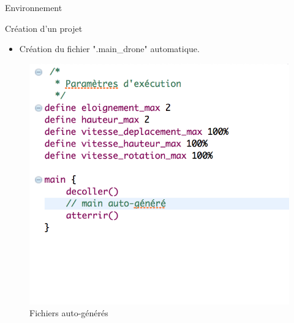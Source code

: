 \documentclass{bredelebeamer}
\begin{document}
\begin{frame}{Environnement}
\begin{block}{Création d'un projet}
\begin{itemize}
\item Création du fichier ".main\_drone" automatique.
\end{itemize}
\end{block}\pause
\begin{figure}
\centering
\includegraphics[scale=0.5]{images/07.png}
\caption{Fichiers auto-générés}
\end{figure}
\end{frame}
\end{document}
